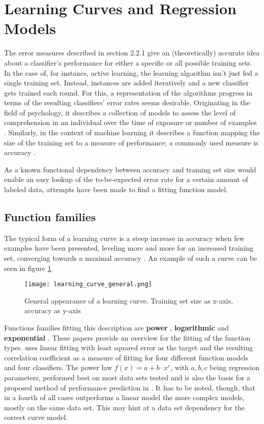 \section{Learning Curves and Regression Models}
The error measures described in section 2.2.1 give an (theoretically) accurate idea about a classifier's performance for either a specific or all possible training sets. In the case of, for instance, active learning, the learning algorithm isn't just fed a single training set. Instead, instances are added iteratively and a new classifier gets trained each round. For this, a representation of the algorithms progress in terms of the resulting classifiers' error rates seems desirable. Originating in the field of psychology, it describes a collection of models to assess the level of comprehension in an individual over the time of exposure or number of examples \cite{Yelle1979}. Similarly, in the context of machine learning it describes a function mapping the size of the training set to a measure of performance; a commonly used measure is accuracy \cite{PerlichEtAl2003}.

As a known functional dependency between accuracy and training set size would enable an easy lookup of the to-be-expected error rate for a certain amount of labeled data, attempts have been made to find a fitting function model.

\subsection{Function families}
The typical form of a learning curve is a steep increase in accuracy when few examples have been presented, leveling more and more for an increased training set, converging towards a maximal accuracy \cite{FigueroaEtal2012}. An example of such a curve can be seen in figure \ref{fig:curve_general}.
\begin{figure}[h]
	\texttt{[image: learning\_curve\_general.png]}
	\caption{General appearance of a learning curve. Training set size as x-axis, accuracy as y-axis \cite{FigueroaEtal2012}}
	\label{fig:curve_general}
\end{figure}
Functions families fitting this description are \textbf{power} \cite{FigueroaEtal2012,Singh2005}, \textbf{logarithmic} and \textbf{exponential} \cite{Singh2005}. These papers provide an overview for the fitting of the function types. \cite{Singh2005} uses linear fitting with least squared error as the target and the resulting correlation coefficient as a measure of fitting for four different function models and four classifiers. The power law $f(x) = a + b \cdot x^c$, with $a, b, c$ being regression parameters, performed best on most data sets tested and is also the basis for a proposed method of performance prediction in \cite{FigueroaEtal2012}. It has to be noted, though, that in a fourth of all cases outperforms a linear model the more complex models, mostly on the same data set. This may hint at a data set dependency for the correct curve model.

